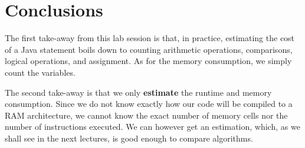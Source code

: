 \documentclass[11pt]{article}
\begin{document}
\section{Conclusions}
\label{sec:org09123de}

The first take-away from this lab session is that, in practice,
estimating the cost of a Java statement boils down to counting
arithmetic operations, comparisons, logical operations, and
assignment. As for the memory consumption, we simply count the
variables.

The second take-away is that we only \textbf{estimate} the runtime and memory
consumption. Since we do not know exactly how our code will be
compiled to a RAM architecture, we cannot know the exact number of
memory cells nor the number of instructions executed. We can however
get an estimation, which, as we shall see in the next lectures, is
good enough to compare algorithms.
\end{document}
